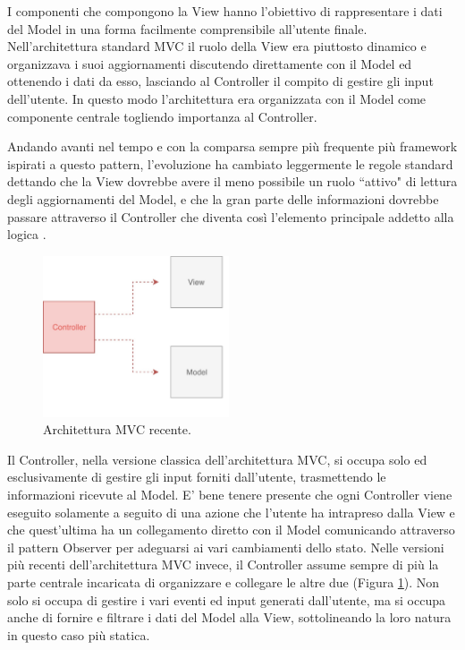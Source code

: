 I componenti che compongono la View hanno l'obiettivo di rappresentare i dati del Model in una forma facilmente comprensibile all'utente finale. Nell'architettura standard MVC il ruolo della View era piuttosto dinamico e organizzava i suoi aggiornamenti discutendo direttamente con il Model ed ottenendo i dati da esso, lasciando al Controller il compito di gestire gli input dell'utente. In questo modo l'architettura era organizzata con il Model come componente centrale togliendo importanza al Controller.

Andando avanti nel tempo e con la comparsa sempre più frequente più framework ispirati a questo pattern, l'evoluzione ha cambiato leggermente le regole standard dettando che la View dovrebbe avere il meno possibile un ruolo “attivo" di lettura degli aggiornamenti del Model, e che la gran parte delle informazioni dovrebbe passare attraverso il Controller che diventa così l'elemento principale addetto alla logica \cite{HopkinsOnMVCandPHP}.

\begin{figure}
\centering 
\includegraphics[width=5.5cm]{./images/MVCpassiveview}
\caption{Architettura MVC recente.}
\label{MVCpassiveview}
\end{figure}

Il Controller, nella versione classica dell'architettura MVC, si occupa solo ed esclusivamente di gestire gli input forniti dall'utente, trasmettendo le informazioni ricevute al Model. E' bene tenere presente che ogni Controller viene eseguito solamente a seguito di una azione che l'utente ha intrapreso dalla View e che quest'ultima ha un collegamento diretto con il Model comunicando attraverso il pattern Observer per adeguarsi ai vari cambiamenti dello stato.
Nelle versioni più recenti dell'architettura MVC invece, il Controller assume sempre di più la parte centrale incaricata di organizzare e collegare le altre due (Figura \ref{MVCpassiveview}). Non solo si occupa di gestire i vari eventi ed input generati dall'utente, ma si occupa anche di fornire e filtrare i dati del Model alla View, sottolineando la loro natura in questo caso più statica.

